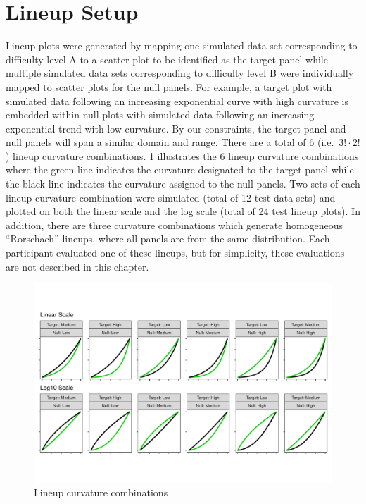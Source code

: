 \documentclass[print]{nuthesis}
\begin{document}
\hypertarget{lineup-setup}{%
\section{Lineup Setup}\label{lineup-setup}}

Lineup plots were generated by mapping one simulated data set corresponding to difficulty level A to a scatter plot to be identified as the target panel while multiple simulated data sets corresponding to difficulty level B were individually mapped to scatter plots for the null panels.
For example, a target plot with simulated data following an increasing exponential curve with high curvature is embedded within null plots with simulated data following an increasing exponential trend with low curvature.
By our constraints, the target panel and null panels will span a similar domain and range.
There are a total of 6 (i.e.~\(3!\cdot 2!\)) lineup curvature combinations.
\cref{fig:curvature-combination-example} illustrates the 6 lineup curvature combinations where the green line indicates the curvature designated to the target panel while the black line indicates the curvature assigned to the null panels.
Two sets of each lineup curvature combination were simulated (total of 12 test data sets) and plotted on both the linear scale and the log scale (total of 24 test lineup plots).
In addition, there are three curvature combinations which generate homogeneous ``Rorschach'' lineups, where all panels are from the same distribution.
Each participant evaluated one of these lineups, but for simplicity, these evaluations are not described in this chapter.

\begin{figure}[tbp]

{\centering \includegraphics[width=1\linewidth,]{thesis_files/figure-latex/curvature-combination-example-1} 

}

\caption{Lineup curvature combinations}\label{fig:curvature-combination-example}
\end{figure}
\end{document}
